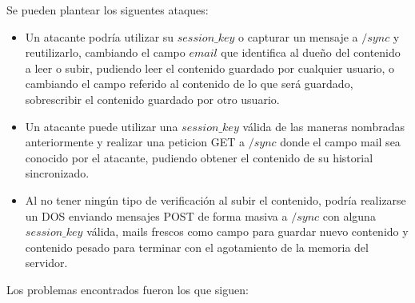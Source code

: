 \documentclass[10pt, a4paper]{article}
\begin{document}
Se pueden plantear los siguentes ataques:
\begin{shaded}
\begin{itemize}
\item Un atacante podría utilizar su $session\_key$ o capturar un mensaje a $/sync$ y reutilizarlo, cambiando el campo $email$ que identifica al dueño del contenido a leer o subir, pudiendo leer el contenido guardado por cualquier usuario, o cambiando el campo referido al contenido de lo que será guardado, sobrescribir el contenido guardado por otro usuario.
\item Un atacante puede utilizar una $session\_key$ válida de las maneras nombradas anteriormente y realizar una peticion GET a $/sync$ donde el campo mail sea conocido por el atacante, pudiendo obtener el contenido de su historial sincronizado.
\item Al no tener ningún tipo de verificación al subir el contenido, podría realizarse un DOS enviando mensajes POST de forma masiva a $/sync$ con alguna $session\_key$ válida, mails frescos como campo para guardar nuevo contenido y contenido pesado para terminar con el agotamiento de la memoria del servidor.
\end{itemize}
\end{shaded}



Los problemas encontrados fueron los que siguen:
\end{document}
